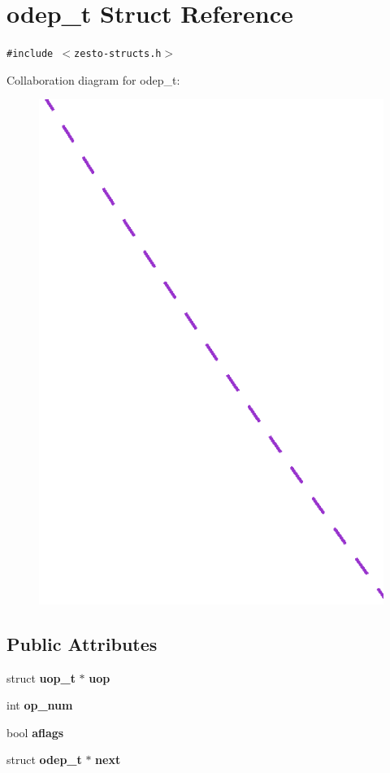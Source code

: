 \section{odep\_\-t Struct Reference}
\label{structodep__t}
{\tt \#include $<$zesto-structs.h$>$}

Collaboration diagram for odep\_\-t:\nopagebreak
\begin{figure}[H]
\begin{center}
\leavevmode
\includegraphics[width=400pt]{structodep__t__coll__graph}
\end{center}
\end{figure}
\subsection*{Public Attributes}
\begin{CompactItemize}
\item 
struct {\bf uop\_\-t} $\ast$ {\bf uop}
\item 
int {\bf op\_\-num}
\item 
bool {\bf aflags}
\item 
struct {\bf odep\_\-t} $\ast$ {\bf next}
\end{CompactItemize}


